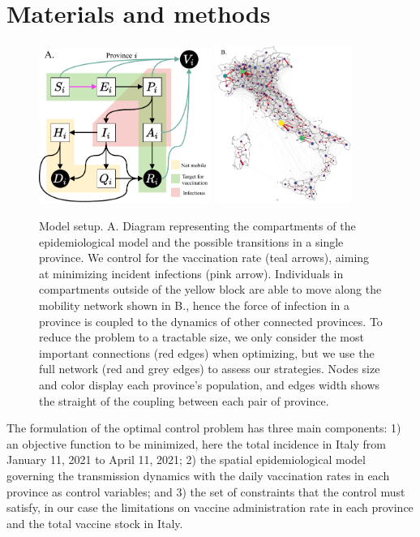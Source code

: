 \section{Materials and methods} \label{sec:matmet}
\begin{figure}[!ht]
    \centering
    \includegraphics[width=0.5\textwidth]{fig_italy-ocp/figures/OCPItalydrawio2.pdf}
    \includegraphics[width=0.40\textwidth]{fig_italy-ocp/figures/map_nd.png}
    \caption[Optimal control model setup]{Model setup. A. Diagram representing the compartments of the epidemiological model and the possible transitions in a single province. We control for the vaccination rate (teal arrows), aiming at minimizing incident infections (pink arrow). Individuals in compartments outside of the yellow block are able to move along the mobility network shown in B., hence the force of infection in a province is coupled to the dynamics of other connected provinces. To reduce the problem to a tractable size, we only consider the most important connections (red edges) when optimizing, but we use the full network (red and grey edges) to assess our strategies. Nodes size and color display each province's population, and edges width shows the straight of the coupling between each pair of province.
    }
    \label{fig:model_description}
\end{figure}
The formulation of the optimal control problem has three main components: 1) an objective function to be minimized, here the total incidence in Italy from January 11, 2021 to April 11, 2021; 2) the spatial epidemiological model\cite{Gatto:SpreadDynamicsCOVID19:2020, Bertuzzo:GeographyCOVID19Spread:2020} governing the transmission dynamics with the daily vaccination rates in each province as control variables; and 3) the set of constraints that the control must satisfy, in our case the limitations on vaccine administration rate in each province and the total vaccine stock in Italy.

